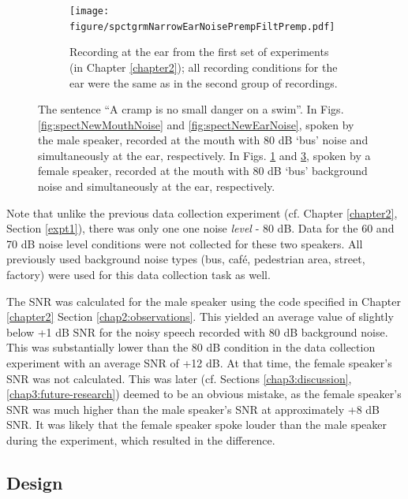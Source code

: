 \begin{figure}[h!]
\begin{subfigure}{0.45\textwidth}
  \label{fig:spectOldMouthNoise}
\end{subfigure}
\qquad
\begin{subfigure}{0.45\textwidth}
  \centering
  \texttt{[image: figure/spctgrmNarrowEarNoisePrempFiltPremp.pdf]}
  \caption{Recording at the ear from the first set of experiments (in Chapter \ref{chapter2}); all recording conditions for the ear were the same as in the second group of recordings.}
  \label{fig:spectOldEarNoise}
\end{subfigure}
\caption{The sentence ``A cramp is no small danger on a swim''. In Figs. \ref{fig:spectNewMouthNoise} and \ref{fig:spectNewEarNoise}, spoken by the male speaker, recorded at the mouth with 80 dB `bus' noise and simultaneously at the ear, respectively.  In Figs. \ref{fig:spectOldMouthNoise} and \ref{fig:spectOldEarNoise}, spoken by a female speaker, recorded at the mouth with 80 dB `bus' background noise and simultaneously at the ear, respectively.}
\end{figure}

Note that unlike the previous data collection experiment (cf. Chapter \ref{chapter2}, Section \ref{expt1}), there was only one one noise \textit{level} - 80 dB.  Data for the 60 and 70 dB noise level conditions were not collected for these two speakers.  All previously used background noise types (bus, caf\'{e}, pedestrian area, street, factory) were used for this data collection task as well.

The SNR was calculated for the male speaker using the code specified in Chapter \ref{chapter2} Section \ref{chap2:observations}.  This yielded an average value of slightly below +1 dB SNR for the noisy speech recorded with 80 dB background noise.  This was substantially lower than the 80 dB condition in the data collection experiment with an average SNR of +12 dB.  At that time, the female speaker's SNR was not calculated.  This was later (cf. Sections \ref{chap3:discussion}, \ref{chap3:future-research}) deemed to be an obvious mistake, as the female speaker's SNR was much higher than the male speaker's SNR at approximately +8 dB SNR.  It was likely that the female speaker spoke louder than the male speaker during the experiment, which resulted in the difference.


\subsection{Design}
\label{chap3:methods:design}

